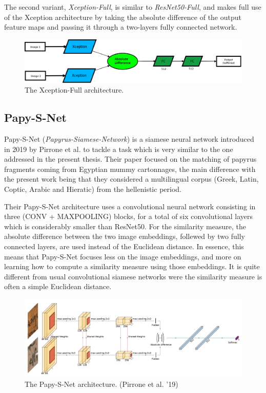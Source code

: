 \documentclass[11pt]{report}
\begin{document}
The second variant, \emph{Xception-Full}, is similar to \emph{ResNet50-Full}, and makes full use of the Xception architecture by taking the absolute difference of the output feature maps and passing it through a two-layers fully connected network.

\begin{figure}[H]
\centering\includegraphics[width=13cm]{diaxcepfull.png}
\caption{The Xception-Full architecture.}
\label{xcepfull}
\end{figure}


\subsection{Papy-S-Net}\label{subsec:papy}

Papy-S-Net (\emph{Papyrus-Siamese-Network}) is a siamese neural network introduced in 2019 by Pirrone et al. \cite{pir19} to tackle a task which is very similar to the one addressed in the present thesis. Their paper focused on the matching of papyrus fragments coming from Egyptian mummy cartonnages, the main difference with the present work being that they considered a multilingual corpus (Greek, Latin, Coptic, Arabic and Hieratic) from the hellenistic period.\newline

Their Papy-S-Net architecture uses a convolutional neural network consisting in three (CONV + MAXPOOLING) blocks, for a total of six convolutional layers which is considerably smaller than ResNet50. For the similarity measure, the absolute difference between the two image embeddings, follewed by two fully connected layers, are used instead of the Euclidean distance. In essence, this means that Papy-S-Net focuses less on the image embeddings, and more on learning how to compute a similarity measure using those embeddings. It is quite different from usual convolutional siamese networks were the similarity measure is often a simple Euclidean distance.

\begin{figure}[H]
\centering\includegraphics[width=15cm]{papysnet.PNG}
\caption{The Papy-S-Net architecture. (Pirrone et al. '19)}
\label{papysnet}
\end{figure}
\end{document}
